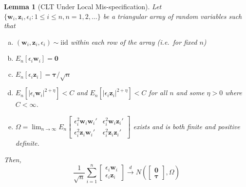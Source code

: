 \documentclass[12pt]{article}
\newtheorem{lem}{Lemma}[section]
\theoremstyle{definition}
\begin{document}
\begin{lem}[CLT Under Local Mis-specification] 
\label{lem:CLT}
 Let $\{\mathbf{w}_i, \mathbf{z}_i, \epsilon_i\colon 1 \leq i \leq n, n = 1, 2, \hdots\}$ be a triangular array of random variables such that 
  \begin{enumerate}[(a)]
    \item $(\mathbf{w}_i, \mathbf{z}_i, \epsilon_i) \sim \mbox {iid}$ within each row of the array (i.e.\ for fixed $n$)
    \item $E_n\left[\epsilon_i \mathbf{w}_i \right] = \mathbf{0}$
    \item $E_n\left[\epsilon_i \mathbf{z}_i \right] = \boldsymbol{\tau}/\sqrt{n}$
    \item $E_n \left[\left|\epsilon_i \mathbf{w}_i\right|^{2+\eta} \right] < C$ and $E_n \left[\left|\epsilon_i \mathbf{z}_i\right|^{2+\eta} \right] < C$ for all $n$ and some $\eta > 0$ where $C < \infty$.
    \item $\displaystyle  \Omega = \lim_{n \rightarrow \infty} E_n \left[\begin{array}{cc}
    \epsilon_i^2 \mathbf{w}_i \mathbf{w}_i' &  \epsilon_i^2 \mathbf{w}_i\mathbf{z}_i '\\
    \epsilon_i^2 \mathbf{z}_i \mathbf{w}_i'& \epsilon_i^2 \mathbf{z}_i \mathbf{z}_i'
    \end{array}\right]$ exists and is both finite and positive definite.
  \end{enumerate}
  Then, 
    $$\frac{1}{\sqrt{n}} \sum_{i=1}^n \left[\begin{array}{c} \epsilon_i \mathbf{w}_i \\ \epsilon_i \mathbf{z}_i \end{array} \right] \overset{d}{\rightarrow} N\left(\left[\begin{array}{c} \mathbf{0} \\ \boldsymbol{\tau} \end{array} \right], \Omega\right)$$
\end{lem}
\end{document}
